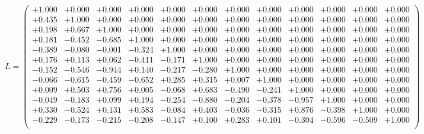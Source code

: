 \documentclass[9pt]{article}
\theoremstyle{plain}
\theoremstyle{definition}
\theoremstyle{remark}
\numberwithin{equation}{section}
\begin{document}
$L = \left(
\begin{array}{
cccccccccccc}
+1.000 & +0.000 & +0.000 & +0.000 & +0.000 & +0.000 & +0.000 & +0.000 & +0.000 & +0.000 & +0.000 & +0.000 \\
+0.435 & +1.000 & +0.000 & +0.000 & +0.000 & +0.000 & +0.000 & +0.000 & +0.000 & +0.000 & +0.000 & +0.000 \\
+0.198 & +0.667 & +1.000 & +0.000 & +0.000 & +0.000 & +0.000 & +0.000 & +0.000 & +0.000 & +0.000 & +0.000 \\
+0.181 & -0.452 & -0.685 & +1.000 & +0.000 & +0.000 & +0.000 & +0.000 & +0.000 & +0.000 & +0.000 & +0.000 \\
-0.389 & -0.080 & -0.001 & -0.324 & +1.000 & +0.000 & +0.000 & +0.000 & +0.000 & +0.000 & +0.000 & +0.000 \\
+0.176 & +0.113 & +0.062 & -0.411 & -0.171 & +1.000 & +0.000 & +0.000 & +0.000 & +0.000 & +0.000 & +0.000 \\
-0.152 & -0.546 & -0.944 & +0.140 & -0.217 & -0.280 & +1.000 & +0.000 & +0.000 & +0.000 & +0.000 & +0.000 \\
-0.066 & -0.615 & -0.459 & -0.652 & +0.285 & +0.315 & +0.007 & +1.000 & +0.000 & +0.000 & +0.000 & +0.000 \\
+0.009 & +0.503 & +0.756 & +0.005 & -0.068 & +0.683 & -0.490 & -0.241 & +1.000 & +0.000 & +0.000 & +0.000 \\
-0.049 & -0.183 & +0.099 & +0.194 & -0.254 & -0.880 & -0.204 & -0.378 & -0.957 & +1.000 & +0.000 & +0.000 \\
+0.330 & -0.524 & +0.131 & +0.583 & -0.084 & +0.403 & -0.036 & -0.315 & +0.876 & -0.398 & +1.000 & +0.000 \\
-0.229 & -0.173 & -0.215 & -0.208 & -0.147 & +0.100 & +0.283 & +0.101 & -0.304 & -0.596 & -0.509 & +1.000 \\
\end{array}
\right)$ \newline 
\end{document}
